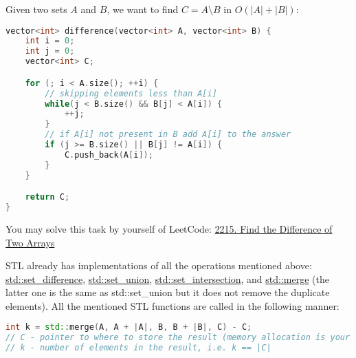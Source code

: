 
Given two sets $A$ and $B$, we want to find $C = A \setminus B$ in $O(|A| + |B|)$:

\begin{lstlisting}[language=C++]
vector<int> difference(vector<int> A, vector<int> B) {
    int i = 0;
    int j = 0;
    vector<int> C;

    for (; i < A.size(); ++i) {
        // skipping elements less than A[i]
        while(j < B.size() && B[j] < A[i]) {
            ++j;
        }
        // if A[i] not present in B add A[i] to the answer
        if (j >= B.size() || B[j] != A[i]) {
            C.push_back(A[i]);
        }
    }

    return C;
}
\end{lstlisting}

You may solve this task by yourself of LeetCode: \href{https://leetcode.com/problems/find-the-difference-of-two-arrays/description/}{2215. Find the Difference of Two Arrays}


STL already has implementations of all the operations mentioned above: \href{https://cplusplus.com/reference/algorithm/set\_difference/}{std::set\_difference}, \href{https://cplusplus.com/reference/algorithm/set\_union/}{std::set\_union}, \href{https://cplusplus.com/reference/algorithm/set\_intersection/}{std::set\_intersection}, and \href{https://cplusplus.com/reference/algorithm/merge/}{std::merge} (the latter one is the same as std::set\_union but it does not remove the duplicate elements). All the mentioned STL functions are called in the following manner:

\begin{lstlisting}[language=C++]
int k = std::merge(A, A + |A|, B, B + |B|, C) - C;
// C - pointer to where to store the result (memory allocation is your responsibility)
// k - number of elements in the result, i.e. k == |C|
\end{lstlisting}